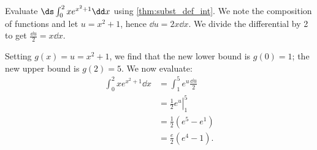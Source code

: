 
\begin{example}\label{ex_subst_def_3}
Evaluate $\ds\int_0^2 xe^{x^2+1}\dd x$ using \autoref{thm:subst_def_int}.
\solution
We note the composition of functions and let $u=x^2+1$, hence $\dd u=2x\dd x$. We divide the differential by 2 to get $\frac{\dd u}2=x\dd x$.

Setting $g(x)=u=x^2+1$, we find that the new lower bound is $g(0)=1$; the new upper bound is $g(2)=5$. We now evaluate:
\begin{align*}
	\int_0^2 xe^{x^2+1}\dd x
	&= \int_1^5 e^u \frac{\dd u}2\\
	&= \left.\frac12 e^u\right|_1^5\\
	&= \frac12(e^5-e^1) \\
	&= \frac e2(e^4-1). %
\end{align*}
\end{example}



